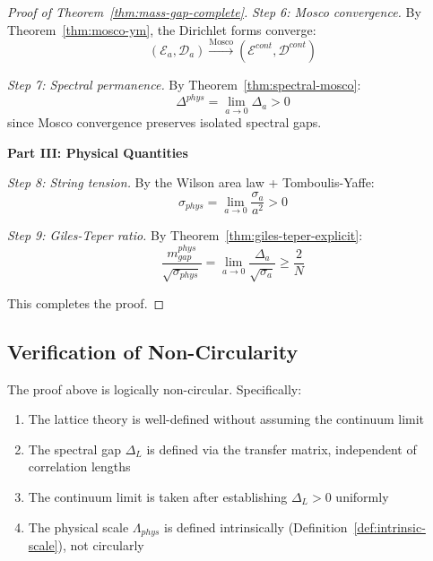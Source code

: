 \begin{proof}[Proof of Theorem~\ref{thm:mass-gap-complete}]
\textit{Step 6: Mosco convergence.}
By Theorem~\ref{thm:mosco-ym}, the Dirichlet forms converge:
\[
(\mathcal{E}_a, \mathcal{D}_a) \xrightarrow{\text{Mosco}} (\mathcal{E}^{cont}, \mathcal{D}^{cont})
\]

\textit{Step 7: Spectral permanence.}
By Theorem~\ref{thm:spectral-mosco}:
\[
\Delta^{phys} = \lim_{a \to 0} \Delta_a > 0
\]
since Mosco convergence preserves isolated spectral gaps.

\textbf{Part III: Physical Quantities}

\textit{Step 8: String tension.}
By the Wilson area law + Tomboulis-Yaffe:
\[
\sigma_{phys} = \lim_{a \to 0} \frac{\sigma_a}{a^2} > 0
\]

\textit{Step 9: Giles-Teper ratio.}
By Theorem~\ref{thm:giles-teper-explicit}:
\[
\frac{m_{gap}^{phys}}{\sqrt{\sigma_{phys}}} = \lim_{a \to 0} \frac{\Delta_a}{\sqrt{\sigma_a}} 
\geq \frac{2}{N}
\]

This completes the proof.
\end{proof}

\subsection{Verification of Non-Circularity}
\label{subsec:non-circularity-check}

\begin{proposition}
\label{prop:non-circularity}
The proof above is logically non-circular. Specifically:
\begin{enumerate}[label=(\roman*)]
\item The lattice theory is well-defined without assuming the continuum limit
\item The spectral gap $\Delta_L$ is defined via the transfer matrix, independent 
      of correlation lengths
\item The continuum limit is taken after establishing $\Delta_L > 0$ uniformly
\item The physical scale $\Lambda_{phys}$ is defined intrinsically 
      (Definition~\ref{def:intrinsic-scale}), not circularly
\end{enumerate}
\end{proposition}

